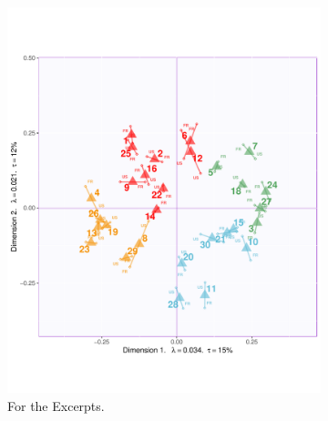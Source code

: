 \documentclass[
  english,
  man,floatsintext]{apa6}
\begin{document}
\begin{figure}
     \centering
     \caption{Partial Factor Scores Plots from the MFA on the Adjectives Survey}
     \begin{subfigure}[b]{0.45\textwidth}
         \centering
         \includegraphics[width=\textwidth]{./Music-Descriptor-Space_files/figure-latex/mfasbs-1}
         \caption{For the Excerpts.}
         \label{fig:excerptspfs}
     \end{subfigure}
     \begin{subfigure}[b]{0.45\textwidth}
         \centering

\end{subfigure}
\end{figure}
\end{document}
